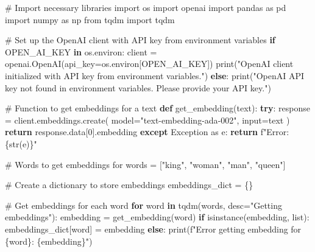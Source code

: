 \documentclass[
  letterpaper,
  DIV=11,
  numbers=noendperiod]{scrartcl}
\newenvironment{Shaded}{\begin{snugshade}}{\end{snugshade}}
\newcommand{\BuiltInTok}[1]{\textcolor[rgb]{0.00,0.23,0.31}{#1}}
\newcommand{\CommentTok}[1]{\textcolor[rgb]{0.37,0.37,0.37}{#1}}
\newcommand{\ControlFlowTok}[1]{\textcolor[rgb]{0.00,0.23,0.31}{\textbf{#1}}}
\newcommand{\DecValTok}[1]{\textcolor[rgb]{0.68,0.00,0.00}{#1}}
\newcommand{\ImportTok}[1]{\textcolor[rgb]{0.00,0.46,0.62}{#1}}
\newcommand{\KeywordTok}[1]{\textcolor[rgb]{0.00,0.23,0.31}{\textbf{#1}}}
\newcommand{\NormalTok}[1]{\textcolor[rgb]{0.00,0.23,0.31}{#1}}
\newcommand{\OperatorTok}[1]{\textcolor[rgb]{0.37,0.37,0.37}{#1}}
\newcommand{\PreprocessorTok}[1]{\textcolor[rgb]{0.68,0.00,0.00}{#1}}
\newcommand{\SpecialCharTok}[1]{\textcolor[rgb]{0.37,0.37,0.37}{#1}}
\newcommand{\SpecialStringTok}[1]{\textcolor[rgb]{0.13,0.47,0.30}{#1}}
\newcommand{\StringTok}[1]{\textcolor[rgb]{0.13,0.47,0.30}{#1}}
\begin{document}
\begin{Shaded}
\begin{Highlighting}[]
\CommentTok{\# Import necessary libraries}
\ImportTok{import}\NormalTok{ os}
\ImportTok{import}\NormalTok{ openai}
\ImportTok{import}\NormalTok{ pandas }\ImportTok{as}\NormalTok{ pd}
\ImportTok{import}\NormalTok{ numpy }\ImportTok{as}\NormalTok{ np}
\ImportTok{from}\NormalTok{ tqdm }\ImportTok{import}\NormalTok{ tqdm}

\CommentTok{\# Set up the OpenAI client with API key from environment variables}
\ControlFlowTok{if} \StringTok{\textquotesingle{}OPEN\_AI\_KEY\textquotesingle{}} \KeywordTok{in}\NormalTok{ os.environ:}
\NormalTok{    client }\OperatorTok{=}\NormalTok{ openai.OpenAI(api\_key}\OperatorTok{=}\NormalTok{os.environ[}\StringTok{\textquotesingle{}OPEN\_AI\_KEY\textquotesingle{}}\NormalTok{])}
    \BuiltInTok{print}\NormalTok{(}\StringTok{"OpenAI client initialized with API key from environment variables."}\NormalTok{)}
\ControlFlowTok{else}\NormalTok{:}
    \BuiltInTok{print}\NormalTok{(}\StringTok{"OpenAI API key not found in environment variables. Please provide your API key."}\NormalTok{)}

\CommentTok{\# Function to get embeddings for a text}
\KeywordTok{def}\NormalTok{ get\_embedding(text):}
    \ControlFlowTok{try}\NormalTok{:}
\NormalTok{        response }\OperatorTok{=}\NormalTok{ client.embeddings.create(}
\NormalTok{            model}\OperatorTok{=}\StringTok{"text{-}embedding{-}ada{-}002"}\NormalTok{,}
            \BuiltInTok{input}\OperatorTok{=}\NormalTok{text}
\NormalTok{        )}
        \ControlFlowTok{return}\NormalTok{ response.data[}\DecValTok{0}\NormalTok{].embedding}
    \ControlFlowTok{except} \PreprocessorTok{Exception} \ImportTok{as}\NormalTok{ e:}
        \ControlFlowTok{return} \SpecialStringTok{f"Error: }\SpecialCharTok{\{}\BuiltInTok{str}\NormalTok{(e)}\SpecialCharTok{\}}\SpecialStringTok{"}

\CommentTok{\# Words to get embeddings for}
\NormalTok{words }\OperatorTok{=}\NormalTok{ [}\StringTok{"king"}\NormalTok{, }\StringTok{"woman"}\NormalTok{, }\StringTok{"man"}\NormalTok{, }\StringTok{"queen"}\NormalTok{]}

\CommentTok{\# Create a dictionary to store embeddings}
\NormalTok{embeddings\_dict }\OperatorTok{=}\NormalTok{ \{\}}

\CommentTok{\# Get embeddings for each word}
\ControlFlowTok{for}\NormalTok{ word }\KeywordTok{in}\NormalTok{ tqdm(words, desc}\OperatorTok{=}\StringTok{"Getting embeddings"}\NormalTok{):}
\NormalTok{    embedding }\OperatorTok{=}\NormalTok{ get\_embedding(word)}
    \ControlFlowTok{if} \BuiltInTok{isinstance}\NormalTok{(embedding, }\BuiltInTok{list}\NormalTok{):}
\NormalTok{        embeddings\_dict[word] }\OperatorTok{=}\NormalTok{ embedding}
    \ControlFlowTok{else}\NormalTok{:}
        \BuiltInTok{print}\NormalTok{(}\SpecialStringTok{f"Error getting embedding for \textquotesingle{}}\SpecialCharTok{\{}\NormalTok{word}\SpecialCharTok{\}}\SpecialStringTok{\textquotesingle{}: }\SpecialCharTok{\{}\NormalTok{embedding}\SpecialCharTok{\}}\SpecialStringTok{"}\NormalTok{)}


\end{Highlighting}
\end{Shaded}
\end{document}
